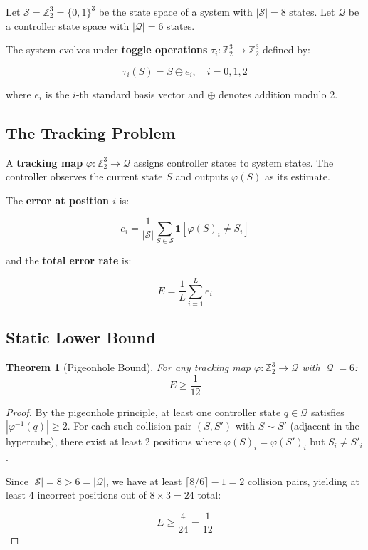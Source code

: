\documentclass[11pt]{article}
\newtheorem{theorem}{Theorem}[section]
\begin{document}
Let $\mathcal{S} = \mathbb{Z}_2^3 = \{0,1\}^3$ be the state space of a system with $|\mathcal{S}| = 8$ states. Let $\mathcal{Q}$ be a controller state space with $|\mathcal{Q}| = 6$ states.

The system evolves under \textbf{toggle operations} $\tau_i: \mathbb{Z}_2^3 \to \mathbb{Z}_2^3$ defined by:

$$\tau_i(S) = S \oplus e_i, \quad i = 0, 1, 2$$

where $e_i$ is the $i$-th standard basis vector and $\oplus$ denotes addition modulo 2.

\subsection{The Tracking Problem}

A \textbf{tracking map} $\varphi: \mathbb{Z}_2^3 \to \mathcal{Q}$ assigns controller states to system states. The controller observes the current state $S$ and outputs $\varphi(S)$ as its estimate.

The \textbf{error at position $i$} is:

$$e_i = \frac{1}{|\mathcal{S}|} \sum_{S \in \mathcal{S}} \mathbf{1}[\varphi(S)_i \neq S_i]$$

and the \textbf{total error rate} is:

$$E = \frac{1}{L} \sum_{i=1}^L e_i$$

\subsection{Static Lower Bound}

\begin{theorem}[Pigeonhole Bound]
For any tracking map $\varphi: \mathbb{Z}_2^3 \to \mathcal{Q}$ with $|\mathcal{Q}| = 6$:
$$E \geq \frac{1}{12}$$
\end{theorem}

\begin{proof}
By the pigeonhole principle, at least one controller state $q \in \mathcal{Q}$ satisfies $|\varphi^{-1}(q)| \geq 2$. For each such collision pair $(S, S')$ with $S \sim S'$ (adjacent in the hypercube), there exist at least 2 positions where $\varphi(S)_i = \varphi(S')_i$ but $S_i \neq S'_i$.

Since $|\mathcal{S}| = 8 > 6 = |\mathcal{Q}|$, we have at least $\lceil 8/6 \rceil - 1 = 2$ collision pairs, yielding at least 4 incorrect positions out of $8 \times 3 = 24$ total:

$$E \geq \frac{4}{24} = \frac{1}{12}$$
\end{proof}
\end{document}
